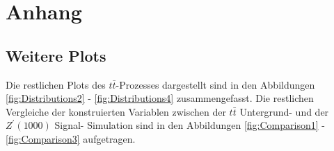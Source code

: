\section{Anhang}

\subsection{Weitere Plots}
\label{sec:reste}

Die restlichen Plots des $t\bar{t}$-Prozesses dargestellt sind in den Abbildungen \ref{fig:Distributions2} - \ref{fig:Distributions4} zusammengefasst.
Die restlichen Vergleiche der konstruierten Variablen zwischen der $t\bar{t}$ Untergrund- und der $Z^\prime(1000)$ Signal- Simulation sind in den Abbildungen \ref{fig:Comparison1} - \ref{fig:Comparison3} aufgetragen.



